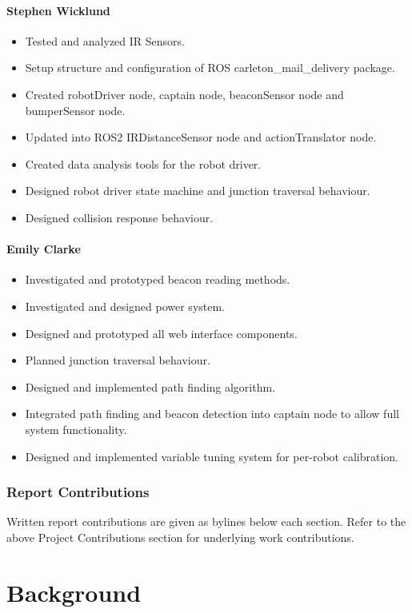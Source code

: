 \documentclass[12pt]{report}
\begin{document}
\subsubsection{Stephen Wicklund}
\begin{itemize}[itemsep=1mm, parsep=0pt]
    \item Tested and analyzed IR Sensors.
    \item Setup structure and configuration of ROS carleton\_mail\_delivery package.
    \item Created robotDriver node, captain node,  beaconSensor node and bumperSensor node.
    \item Updated into ROS2 IRDistanceSensor node and actionTranslator node.
    \item Created data analysis tools for the robot driver.
    \item Designed robot driver state machine and junction traversal behaviour.
    \item Designed collision response behaviour.
\end{itemize}

\subsubsection{Emily Clarke}
\begin{itemize}[itemsep=1mm, parsep=0pt]
    \item Investigated and prototyped beacon reading methods.
    \item Investigated and designed power system.
    \item Designed and prototyped all web interface components.
    \item Planned junction traversal behaviour.
    \item Designed and implemented path finding algorithm.
    \item Integrated path finding and beacon detection into captain node to allow full system functionality.
    \item Designed and implemented variable tuning system for per-robot calibration.
\end{itemize}
\subsection{Report Contributions}
Written report contributions are given as bylines below each section. Refer to the above Project Contributions section for underlying work contributions.
\chapter{Background}
\end{document}

